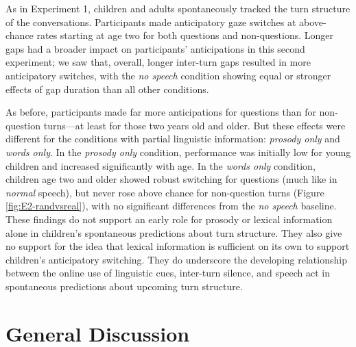 \documentclass[authoryear, 12pt]{elsarticle}
\begin{document}
As in Experiment 1, children and adults spontaneously tracked the turn structure of the conversations. Participants made anticipatory gaze switches at above-chance rates starting at age two for both questions and non-questions. Longer gaps had a broader impact on participants' anticipations in this second experiment; we saw that, overall, longer inter-turn gaps resulted in more anticipatory switches, with the \textit{no speech} condition showing equal or stronger effects of gap duration than all other conditions.

As before, participants made far more anticipations for questions than for non-question turns---at least for those two years old and older. But these effects were different for the conditions with partial linguistic information: \textit{prosody only} and \textit{words only}. In the \textit{prosody only} condition, performance was initially low for young children and increased significantly with age. In the \textit{words only} condition, children age two and older showed robust switching for questions (much like in \textit{normal} speech), but never rose above chance for non-question turns (Figure \ref{fig:E2-randvsreal}), with no significant differences from the \textit{no speech} baseline. These findings do not support an early role for prosody or lexical information alone in children's spontaneous predictions about turn structure. They also give no support for the idea that lexical information is sufficient on its own to support children's anticipatory switching. They do underscore the developing relationship between the online use of linguistic cues, inter-turn silence, and speech act in spontaneous predictions about upcoming turn structure.

\section*{General Discussion}
\label{sec:gendisc}
\end{document}
